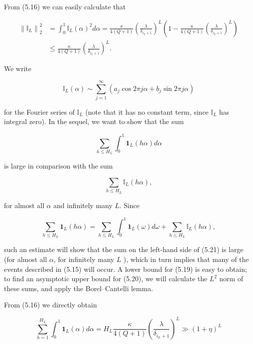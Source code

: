 \documentclass[10pt]{article}
\newcommand{\1}{\mathbf{1}}
\begin{document}
From (5.16) we can easily calculate that


\begin{align*}
\left\|\mathbb{I}_{L}\right\|_{2}^{2} & =\int_{0}^{1} \mathbb{I}_{L}(\alpha)^{2} d \alpha=\frac{\kappa}{4(Q+1)}\left(\frac{\lambda}{\delta_{i_{L}+1}}\right)^{L}\left(1-\frac{\kappa}{4(Q+1)}\left(\frac{\lambda}{\delta_{i_{L}+1}}\right)^{L}\right) \\
& \leqslant \frac{\kappa}{4(Q+1)}\left(\frac{\lambda}{\delta_{i_{L}+1}}\right)^{L} . \tag{5.18}
\end{align*}


We write

$$
\mathbb{I}_{L}(\alpha) \sim \sum_{j=1}^{\infty}\left(a_{j} \cos 2 \pi j \alpha+b_{j} \sin 2 \pi j \alpha\right)
$$

for the Fourier series of $\mathbb{I}_{L}$ (note that it has no constant term, since $\mathbb{I}_{L}$ has integral zero). In the sequel, we want to show that the sum


\begin{equation*}
\sum_{h \leqslant H_{L}} \int_{0}^{1} \mathbf{1}_{L}(h \alpha) d \alpha \tag{5.19}
\end{equation*}


is large in comparison with the sum


\begin{equation*}
\sum_{h \leqslant H_{L}} \mathbb{I}_{L}(h \alpha), \tag{5.20}
\end{equation*}


for almost all $\alpha$ and infinitely many $L$. Since


\begin{equation*}
\sum_{h \leqslant H_{L}} \mathbf{1}_{L}(h \alpha)=\sum_{h \leqslant H_{L}} \int_{0}^{1} \mathbf{1}_{L}(\omega) d \omega+\sum_{h \leqslant H_{L}} \mathbb{I}_{L}(h \alpha), \tag{5.21}
\end{equation*}


such an estimate will show that the sum on the left-hand side of (5.21) is large (for almost all $\alpha$, for infinitely many $L$ ), which in turn implies that many of the events described in (5.15) will occur. A lower bound for (5.19) is easy to obtain; to find an asymptotic upper bound for (5.20), we will calculate the $L^{2}$ norm of these sums, and apply the Borel--Cantelli lemma.

From (5.16) we directly obtain


\begin{equation*}
\sum_{h=1}^{H_{L}} \int_{0}^{1} \mathbf{1}_{L}(\alpha) d \alpha=H_{L} \frac{\kappa}{4(Q+1)}\left(\frac{\lambda}{\delta_{i_{L}+1}}\right)^{L} \gg(1+\eta)^{L} \tag{5.22}
\end{equation*}
\end{document}

